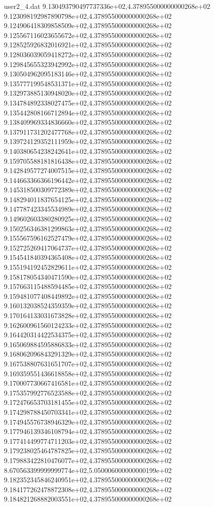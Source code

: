 \begin{filecontents}{user2_4.dat}
9.130493790497737336e+02,4.378955000000000268e+02
9.123098192987890798e+02,4.378955000000000268e+02
9.124906418309858509e+02,4.378955000000000268e+02
9.125567116023655672e+02,4.378955000000000268e+02
9.128525926832016921e+02,4.378955000000000268e+02
9.128036039059418272e+02,4.378955000000000268e+02
9.129845655323942992e+02,4.378955000000000268e+02
9.130504962095183146e+02,4.378955000000000268e+02
9.135777199548531371e+02,4.378955000000000268e+02
9.132973885130948020e+02,4.378955000000000268e+02
9.134784892338027475e+02,4.378955000000000268e+02
9.135442808166712894e+02,4.378955000000000268e+02
9.138409969334836660e+02,4.378955000000000268e+02
9.137911731202477768e+02,4.378955000000000268e+02
9.139724129352111959e+02,4.378955000000000268e+02
9.140380654238242641e+02,4.378955000000000268e+02
9.159705588181816438e+02,4.378955000000000268e+02
9.142849577274007515e+02,4.378955000000000268e+02
9.144663366366196442e+02,4.378955000000000268e+02
9.145318500309772389e+02,4.378955000000000268e+02
9.148294011837654125e+02,4.378955000000000268e+02
9.147787423345534989e+02,4.378955000000000268e+02
9.149602603380280925e+02,4.378955000000000268e+02
9.150256346381299863e+02,4.378955000000000268e+02
9.155567596162527479e+02,4.378955000000000268e+02
9.152725269417064737e+02,4.378955000000000268e+02
9.154541840394365408e+02,4.378955000000000268e+02
9.155194192452829611e+02,4.378955000000000268e+02
9.158178054340471590e+02,4.378955000000000268e+02
9.157663115488594485e+02,4.378955000000000268e+02
9.159481077408449892e+02,4.378955000000000268e+02
9.160132038524359359e+02,4.378955000000000268e+02
9.170164133031673828e+02,4.378955000000000268e+02
9.162600961560124233e+02,4.378955000000000268e+02
9.164420314422534375e+02,4.378955000000000268e+02
9.165069884595886833e+02,4.378955000000000268e+02
9.168062096843291329e+02,4.378955000000000268e+02
9.167538807631651707e+02,4.378955000000000268e+02
9.169359551436618858e+02,4.378955000000000268e+02
9.170007730667416581e+02,4.378955000000000268e+02
9.175357992776523588e+02,4.378955000000000268e+02
9.172476653703181455e+02,4.378955000000000268e+02
9.174298788450703341e+02,4.378955000000000268e+02
9.174945576738946329e+02,4.378955000000000268e+02
9.177946139346108794e+02,4.378955000000000268e+02
9.177414499774711203e+02,4.378955000000000268e+02
9.179238025464787825e+02,4.378955000000000268e+02
9.179883422810476077e+02,4.378955000000000268e+02
8.670563399999999774e+02,5.050006000000000199e+02
9.182352345846240951e+02,4.378955000000000268e+02
9.184177262478872308e+02,4.378955000000000268e+02
9.184821268882003551e+02,4.378955000000000268e+02

\end{filecontents}
